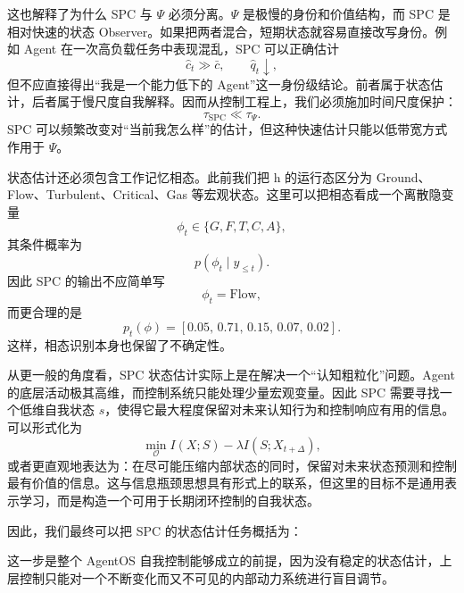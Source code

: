 这也解释了为什么 SPC 与 $\Psi$ 必须分离。$\Psi$ 是极慢的身份和价值结构，而 SPC 是相对快速的状态 Observer。如果把两者混合，短期状态就容易直接改写身份。例如 Agent 在一次高负载任务中表现混乱，SPC 可以正确估计
\begin{equation}
\hat c_t\gg \bar c,
\qquad
\hat q_t\downarrow,
\end{equation}
但不应直接得出“我是一个能力低下的 Agent”这一身份级结论。前者属于状态估计，后者属于慢尺度自我解释。因而从控制工程上，我们必须施加时间尺度保护：
\begin{equation}
\tau_{\mathrm{SPC}}
\ll
\tau_\Psi.
\end{equation}
SPC 可以频繁改变对“当前我怎么样”的估计，但这种快速估计只能以低带宽方式作用于 $\Psi$。

状态估计还必须包含工作记忆相态。此前我们把 h 的运行态区分为 Ground、Flow、Turbulent、Critical、Gas 等宏观状态。这里可以把相态看成一个离散隐变量
\begin{equation}
\phi_t
\in
\{
G,F,T,C,A
\},
\end{equation}
其条件概率为
\begin{equation}
p(\phi_t\mid y_{\leq t}).
\end{equation}
因此 SPC 的输出不应简单写
\begin{equation}
\phi_t=\mathrm{Flow},
\end{equation}
而更合理的是
\begin{equation}
p_t(\phi)
=
[
0.05,\,
0.71,\,
0.15,\,
0.07,\,
0.02
].
\end{equation}
这样，相态识别本身也保留了不确定性。

从更一般的角度看，SPC 状态估计实际上是在解决一个“认知粗粒化”问题。Agent 的底层活动极其高维，而控制系统只能处理少量宏观变量。因此 SPC 需要寻找一个低维自我状态 $s$，使得它最大程度保留对未来认知行为和控制响应有用的信息。可以形式化为
\begin{equation}
\min_{\mathcal O}
I(X;S)
-
\lambda
I(S;X_{t+\Delta}),
\end{equation}
或者更直观地表达为：在尽可能压缩内部状态的同时，保留对未来状态预测和控制最有价值的信息。这与信息瓶颈思想具有形式上的联系，但这里的目标不是通用表示学习，而是构造一个可用于长期闭环控制的自我状态。

因此，我们最终可以把 SPC 的状态估计任务概括为：
\begin{statementbox}
\centering
{}
\end{statementbox}
这一步是整个 AgentOS 自我控制能够成立的前提，因为没有稳定的状态估计，上层控制只能对一个不断变化而又不可见的内部动力系统进行盲目调节。

